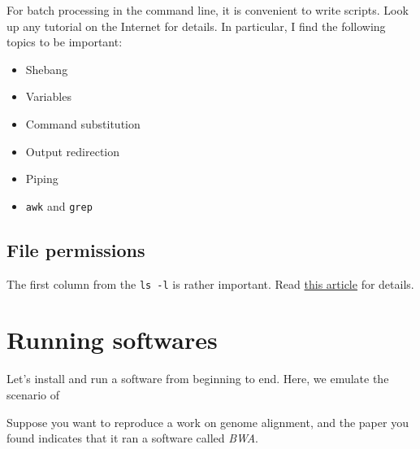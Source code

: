 \documentclass[12pt,letterpaper]{article}
\begin{document}
For batch processing in the command line, it is convenient to write scripts. Look up any tutorial on the Internet for details. In particular, I find the following topics to be important:

\begin{itemize}
   \item Shebang
   \item Variables
   \item Command substitution
   \item Output redirection
   \item Piping
   \item \texttt{awk} and \texttt{grep}
\end{itemize}

\subsection{File permissions}

The first column from the \texttt{ls -l} is rather important. Read \href{https://www.redhat.com/sysadmin/linux-file-permissions-explained}{this article} for details.

\section{Running softwares}

Let's install and run a software from beginning to end. Here, we emulate the scenario of 

Suppose you want to reproduce a work on genome alignment, and the paper you found indicates that it ran a software called \textit{BWA}.
\end{document}
